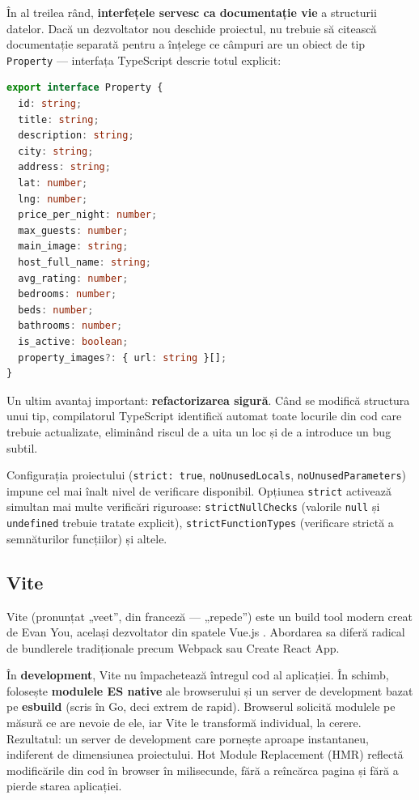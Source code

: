 \documentclass[12pt,a4paper,oneside]{report}
\begin{document}
În al treilea rând, \textbf{interfețele servesc ca documentație vie} a structurii datelor. Dacă un dezvoltator nou deschide proiectul, nu trebuie să citească documentație separată pentru a înțelege ce câmpuri are un obiect de tip \texttt{Property} — interfața TypeScript descrie totul explicit:

\begin{lstlisting}[language=TypeScript, caption={Interfața Property din PrimeRent}]
export interface Property {
  id: string;
  title: string;
  description: string;
  city: string;
  address: string;
  lat: number;
  lng: number;
  price_per_night: number;
  max_guests: number;
  main_image: string;
  host_full_name: string;
  avg_rating: number;
  bedrooms: number;
  beds: number;
  bathrooms: number;
  is_active: boolean;
  property_images?: { url: string }[];
}
\end{lstlisting}

Un ultim avantaj important: \textbf{refactorizarea sigură}. Când se modifică structura unui tip, compilatorul TypeScript identifică automat toate locurile din cod care trebuie actualizate, eliminând riscul de a uita un loc și de a introduce un bug subtil.

Configurația proiectului (\texttt{strict: true}, \texttt{noUnusedLocals}, \texttt{noUnusedParameters}) impune cel mai înalt nivel de verificare disponibil. Opțiunea \texttt{strict} activează simultan mai multe verificări riguroase: \texttt{strictNullChecks} (valorile \texttt{null} și \texttt{undefined} trebuie tratate explicit), \texttt{strictFunctionTypes} (verificare strictă a semnăturilor funcțiilor) și altele.

\subsection{Vite}

Vite (pronunțat „veet'', din franceză — „repede'') este un build tool modern creat de Evan You, același dezvoltator din spatele Vue.js \cite{vite}. Abordarea sa diferă radical de bundlerele tradiționale precum Webpack sau Create React App.

În \textbf{development}, Vite nu împachetează întregul cod al aplicației. În schimb, folosește \textbf{modulele ES native} ale browserului și un server de development bazat pe \textbf{esbuild} (scris în Go, deci extrem de rapid). Browserul solicită modulele pe măsură ce are nevoie de ele, iar Vite le transformă individual, la cerere. Rezultatul: un server de development care pornește aproape instantaneu, indiferent de dimensiunea proiectului. Hot Module Replacement (HMR) reflectă modificările din cod în browser în milisecunde, fără a reîncărca pagina și fără a pierde starea aplicației.
\end{document}
